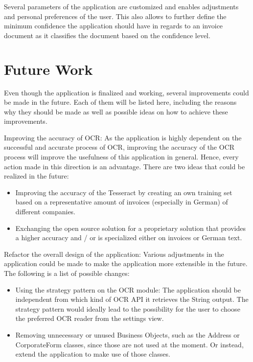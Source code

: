 Several parameters of the application are customized and enables adjustments and personal preferences of the user. This also allows to further define the minimum confidence the application should have in regards to an invoice document as it classifies the document based on the confidence level. 

\section{Future Work}
\label{sec6.2}
Even though the application is finalized and working, several improvements could be made in the future.
Each of them will be listed here, including the reasons why they should be made as well as possible ideas on how to achieve these improvements.

Improving the accuracy of OCR: As the application is highly dependent on the successful and accurate process of OCR, improving the accuracy of the OCR process will improve the usefulness of this application in general. Hence, every action made in this direction is an advantage. There are two ideas that could be realized in the future: 
	\begin{itemize}
		\item Improving the accuracy of the Tesseract by creating an own training set based on a representative amount of invoices (especially in German) of different companies. 
		\item Exchanging the open source solution for a proprietary solution that provides a higher accuracy and / or is specialized either on invoices or German text.
	\end{itemize}

Refactor the overall design of the application: Various adjustments in the application could be made to make the application more extensible in the future. The following is a list of possible changes:
	\begin{itemize}
		\item Using the strategy pattern on the OCR module: The application should be independent from which kind of OCR API it retrieves the String output. The strategy pattern would ideally lead to the possibility for the user to choose the preferred OCR reader from the settings view.
		\item Removing unnecessary or unused Business Objects, such as the Address or CorporateForm classes, since those are not used at the moment. Or instead, extend the application to make use of those classes.
	\end{itemize}

